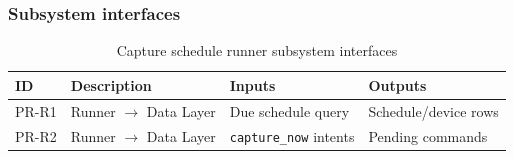 \subsubsection{Subsystem interfaces}
\begin{table}[H]
\centering
\small
\begin{tabular}{|p{0.9cm}|p{3.4cm}|p{3.0cm}|p{3.5cm}|}
\hline
\textbf{ID} & \textbf{Description} & \textbf{Inputs} & \textbf{Outputs} \\
\hline
PR-R1 & Runner $\rightarrow$ Data Layer & Due schedule query & Schedule/device rows \\
\hline
PR-R2 & Runner $\rightarrow$ Data Layer & \texttt{capture\_now} intents & Pending commands \\
\hline
\end{tabular}
\caption{Capture schedule runner subsystem interfaces}
\end{table}
